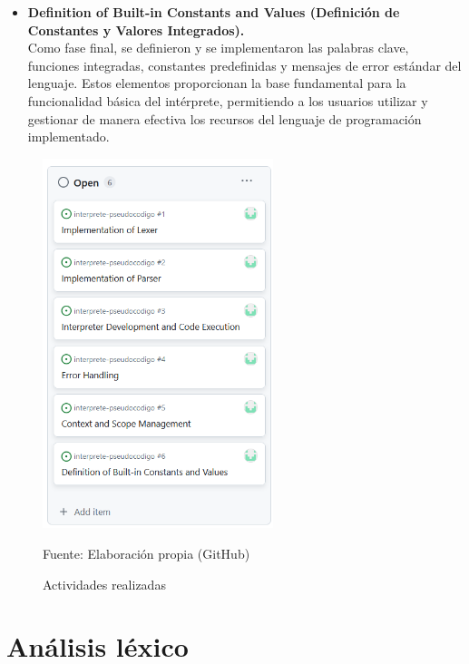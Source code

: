 \begin{itemize}
  \item \textbf{Definition of Built-in Constants and Values (Definición de Constantes y Valores Integrados).} \\
  Como fase final, se definieron y se implementaron las palabras clave, funciones integradas, constantes predefinidas y mensajes de error estándar del lenguaje. Estos elementos proporcionan la base fundamental para la funcionalidad básica del intérprete, permitiendo a los usuarios utilizar y gestionar de manera efectiva los recursos del lenguaje de programación implementado.
\end{itemize}

\begin{figure}[!h]
  \centering
  \includegraphics[width=0.6\textwidth]{images/actividades.png}
  \caption{Actividades realizadas}
  \centering Fuente: Elaboración propia (GitHub)
  \label{fig:actividades}
\end{figure}

\section{Análisis léxico}
